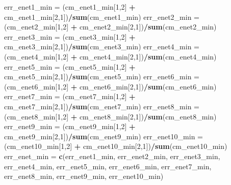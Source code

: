 \documentclass[
]{article}
\newenvironment{Shaded}{\begin{snugshade}}{\end{snugshade}}
\newcommand{\DecValTok}[1]{\textcolor[rgb]{0.00,0.00,0.81}{#1}}
\newcommand{\KeywordTok}[1]{\textcolor[rgb]{0.13,0.29,0.53}{\textbf{#1}}}
\newcommand{\NormalTok}[1]{#1}
\newcommand{\OperatorTok}[1]{\textcolor[rgb]{0.81,0.36,0.00}{\textbf{#1}}}
\newcommand{\StringTok}[1]{\textcolor[rgb]{0.31,0.60,0.02}{#1}}
\begin{document}
\begin{Shaded}
\begin{Highlighting}[]
\NormalTok{err_enet1_min =}\StringTok{ }\NormalTok{(cm_enet1_min[}\DecValTok{1}\NormalTok{,}\DecValTok{2}\NormalTok{] }\OperatorTok{+}\StringTok{ }\NormalTok{cm_enet1_min[}\DecValTok{2}\NormalTok{,}\DecValTok{1}\NormalTok{])}\OperatorTok{/}\KeywordTok{sum}\NormalTok{(cm_enet1_min)}
\NormalTok{err_enet2_min =}\StringTok{ }\NormalTok{(cm_enet2_min[}\DecValTok{1}\NormalTok{,}\DecValTok{2}\NormalTok{] }\OperatorTok{+}\StringTok{ }\NormalTok{cm_enet2_min[}\DecValTok{2}\NormalTok{,}\DecValTok{1}\NormalTok{])}\OperatorTok{/}\KeywordTok{sum}\NormalTok{(cm_enet2_min)}
\NormalTok{err_enet3_min =}\StringTok{ }\NormalTok{(cm_enet3_min[}\DecValTok{1}\NormalTok{,}\DecValTok{2}\NormalTok{] }\OperatorTok{+}\StringTok{ }\NormalTok{cm_enet3_min[}\DecValTok{2}\NormalTok{,}\DecValTok{1}\NormalTok{])}\OperatorTok{/}\KeywordTok{sum}\NormalTok{(cm_enet3_min)}
\NormalTok{err_enet4_min =}\StringTok{ }\NormalTok{(cm_enet4_min[}\DecValTok{1}\NormalTok{,}\DecValTok{2}\NormalTok{] }\OperatorTok{+}\StringTok{ }\NormalTok{cm_enet4_min[}\DecValTok{2}\NormalTok{,}\DecValTok{1}\NormalTok{])}\OperatorTok{/}\KeywordTok{sum}\NormalTok{(cm_enet4_min)}
\NormalTok{err_enet5_min =}\StringTok{ }\NormalTok{(cm_enet5_min[}\DecValTok{1}\NormalTok{,}\DecValTok{2}\NormalTok{] }\OperatorTok{+}\StringTok{ }\NormalTok{cm_enet5_min[}\DecValTok{2}\NormalTok{,}\DecValTok{1}\NormalTok{])}\OperatorTok{/}\KeywordTok{sum}\NormalTok{(cm_enet5_min)}
\NormalTok{err_enet6_min =}\StringTok{ }\NormalTok{(cm_enet6_min[}\DecValTok{1}\NormalTok{,}\DecValTok{2}\NormalTok{] }\OperatorTok{+}\StringTok{ }\NormalTok{cm_enet6_min[}\DecValTok{2}\NormalTok{,}\DecValTok{1}\NormalTok{])}\OperatorTok{/}\KeywordTok{sum}\NormalTok{(cm_enet6_min)}
\NormalTok{err_enet7_min =}\StringTok{ }\NormalTok{(cm_enet7_min[}\DecValTok{1}\NormalTok{,}\DecValTok{2}\NormalTok{] }\OperatorTok{+}\StringTok{ }\NormalTok{cm_enet7_min[}\DecValTok{2}\NormalTok{,}\DecValTok{1}\NormalTok{])}\OperatorTok{/}\KeywordTok{sum}\NormalTok{(cm_enet7_min)}
\NormalTok{err_enet8_min =}\StringTok{ }\NormalTok{(cm_enet8_min[}\DecValTok{1}\NormalTok{,}\DecValTok{2}\NormalTok{] }\OperatorTok{+}\StringTok{ }\NormalTok{cm_enet8_min[}\DecValTok{2}\NormalTok{,}\DecValTok{1}\NormalTok{])}\OperatorTok{/}\KeywordTok{sum}\NormalTok{(cm_enet8_min)}
\NormalTok{err_enet9_min =}\StringTok{ }\NormalTok{(cm_enet9_min[}\DecValTok{1}\NormalTok{,}\DecValTok{2}\NormalTok{] }\OperatorTok{+}\StringTok{ }\NormalTok{cm_enet9_min[}\DecValTok{2}\NormalTok{,}\DecValTok{1}\NormalTok{])}\OperatorTok{/}\KeywordTok{sum}\NormalTok{(cm_enet9_min)}
\NormalTok{err_enet10_min =}\StringTok{ }\NormalTok{(cm_enet10_min[}\DecValTok{1}\NormalTok{,}\DecValTok{2}\NormalTok{] }\OperatorTok{+}\StringTok{ }\NormalTok{cm_enet10_min[}\DecValTok{2}\NormalTok{,}\DecValTok{1}\NormalTok{])}\OperatorTok{/}\KeywordTok{sum}\NormalTok{(cm_enet10_min)}
\NormalTok{err_enet_min =}\StringTok{ }\KeywordTok{c}\NormalTok{(err_enet1_min, err_enet2_min, err_enet3_min, err_enet4_min, err_enet5_min, err_enet6_min, err_enet7_min, err_enet8_min, err_enet9_min, err_enet10_min)}
\end{Highlighting}
\end{Shaded}
\end{document}
